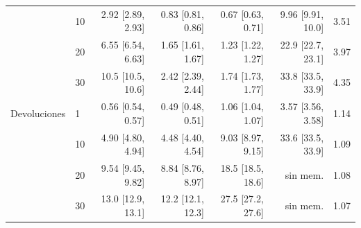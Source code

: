 \begin{tabular}{@{}llrrrrr@{}}
 & 10 & 2.92 {\scriptsize[2.89, 2.93]} & 0.83 {\scriptsize[0.81, 0.86]} & 0.67 {\scriptsize[0.63, 0.71]} & 9.96 {\scriptsize[9.91, 10.0]} & 3.51 \\
 & 20 & 6.55 {\scriptsize[6.54, 6.63]} & 1.65 {\scriptsize[1.61, 1.67]} & 1.23 {\scriptsize[1.22, 1.27]} & 22.9 {\scriptsize[22.7, 23.1]} & 3.97 \\
 & 30 & 10.5 {\scriptsize[10.5, 10.6]} & 2.42 {\scriptsize[2.39, 2.44]} & 1.74 {\scriptsize[1.73, 1.77]} & 33.8 {\scriptsize[33.5, 33.9]} & 4.35 \\
\midrule
Devoluciones & 1 & 0.56 {\scriptsize[0.54, 0.57]} & 0.49 {\scriptsize[0.48, 0.51]} & 1.06 {\scriptsize[1.04, 1.07]} & 3.57 {\scriptsize[3.56, 3.58]} & 1.14 \\
 & 10 & 4.90 {\scriptsize[4.80, 4.94]} & 4.48 {\scriptsize[4.40, 4.54]} & 9.03 {\scriptsize[8.97, 9.15]} & 33.6 {\scriptsize[33.5, 33.9]} & 1.09 \\
 & 20 & 9.54 {\scriptsize[9.45, 9.82]} & 8.84 {\scriptsize[8.76, 8.97]} & 18.5 {\scriptsize[18.5, 18.6]} & sin mem. & 1.08 \\
 & 30 & 13.0 {\scriptsize[12.9, 13.1]} & 12.2 {\scriptsize[12.1, 12.3]} & 27.5 {\scriptsize[27.2, 27.6]} & sin mem. & 1.07 \\
\bottomrule
\end{tabular}